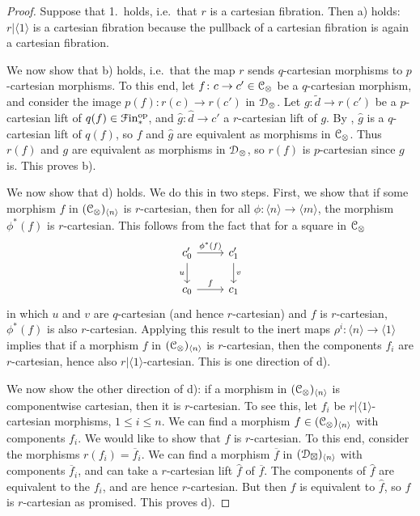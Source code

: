 \documentclass[main.tex]{subfiles}
\begin{document}
\begin{proof}
  Suppose that 1.\ holds, i.e.\ that $r$ is a cartesian fibration. Then a) holds: $r|\langle 1 \rangle$ is a cartesian fibration because the pullback of a cartesian fibration is again a cartesian fibration.

  We now show that b) holds, i.e.\ that the map $r$ sends $q$-cartesian morphisms to $p$-cartesian morphisms. To this end, let $f\colon c \to c' \in \mathcal{C}_{\otimes}$ be a $q$-cartesian morphism, and consider the image $p(f)\colon r(c) \to r(c')$ in $\mathcal{D}_{\otimes}$. Let $g\colon \tilde{d} \to r(c')$ be a $p$-cartesian lift of $q(f) \in \mathcal{F}\mathrm{in}_{*}^{\mathrm{op}}$, and $\hat{g}\colon \hat{d} \to c'$ a $r$-cartesian lift of $g$. By \cite[Prop.~2.4.1.3]{highertopostheory}, $\hat{g}$ is a $q$-cartesian lift of $q(f)$, so $f$ and $\hat{g}$ are equivalent as morphisms in $\mathcal{C}_{\otimes}$. Thus $r(f)$ and $g$ are equivalent as morphisms in $\mathcal{D}_{\otimes}$, so $r(f)$ is $p$-cartesian since $g$ is. This proves b).

  We now show that d) holds. We do this in two steps. First, we show that if some morphism $f$ in $(\mathcal{C}_{\otimes})_{\langle n \rangle}$ is $r$-cartesian, then for all $\phi\colon \langle n \rangle \to \langle m \rangle$, the morphism $\phi^{*}(f)$ is $r$-cartesian. This follows from the fact that for a square in $\mathcal{C}_{\otimes}$
  \begin{equation*}
    \begin{tikzcd}
      c_{0}'
      \arrow[r, "\phi^{*}(f)"]
      \arrow[d, swap, "u"]
      & c_{1}'
      \arrow[d, "v"]
      \\
      c_{0}
      \arrow[r, "f"]
      & c_{1}
    \end{tikzcd}
  \end{equation*}
  in which $u$ and $v$ are $q$-cartesian (and hence $r$-cartesian) and $f$ is $r$-cartesian, $\phi^{*}(f)$ is also $r$-cartesian. Applying this result to the inert maps $\rho^{i}\colon \langle n \rangle \to \langle 1 \rangle$ implies that if a morphism $f$ in $(\mathcal{C}_{\otimes})_{\langle n \rangle}$ is $r$-cartesian, then the components $f_{i}$ are $r$-cartesian, hence also $r|\langle 1 \rangle$-cartesian. This is one direction of d).

  We now show the other direction of d): if a morphism in $(\mathcal{C}_{\otimes})_{\langle n \rangle}$ is componentwise cartesian, then it is $r$-cartesian. To see this, let $f_{i}$ be $r|\langle 1 \rangle$-cartesian morphisms, $1 \leq i \leq n$. We can find a morphism $f \in (\mathcal{C}_{\otimes})_{\langle n \rangle}$ with components $f_{i}$. We would like to show that $f$ is $r$-cartesian. To this end, consider the morphisms $r(f_{i}) = \overline{f}_{i}$. We can find a morphism $\overline{f}$ in $(\mathcal{D}_{\boxtimes})_{\langle n \rangle}$ with components $\overline{f}_{i}$, and can take a $r$-cartesian lift $\hat{f}$ of $\overline{f}$. The components of $\hat{f}$ are equivalent to the $f_{i}$, and are hence $r$-cartesian. But then $f$ is equivalent to $\hat{f}$, so $f$ is $r$-cartesian as promised. This proves d).


\end{proof}
\end{document}
